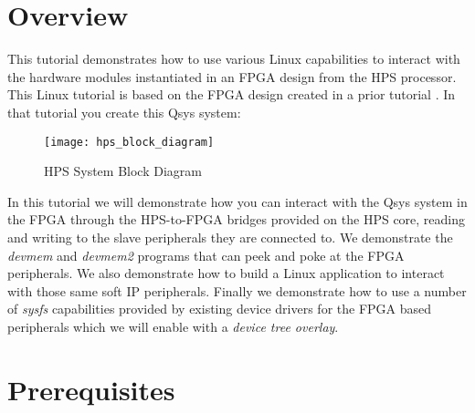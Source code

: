 \tableofcontents

\section*{Overview}

\begin{flushleft}
\noindent
This tutorial demonstrates how to use various Linux capabilities to interact with the hardware modules instantiated in an FPGA design from the HPS processor.  This Linux tutorial is based on the FPGA design created in a prior tutorial .  In that tutorial you create this Qsys system:

\begin{figure}[H]
\centering
\texttt{[image: hps\_block\_diagram]}
\caption{HPS System Block Diagram}
\label{fig:hps_block_diagram}
\end{figure}

In this tutorial we will demonstrate how you can interact with the Qsys system in the FPGA through the HPS-to-FPGA bridges provided on the HPS core, reading and writing to the slave peripherals they are connected to.  We demonstrate the \emph{devmem} and \emph{devmem2} programs that can peek and poke at the FPGA peripherals.  We also demonstrate how to build a Linux application to interact with those same soft IP peripherals.  Finally we demonstrate how to use a number of \emph{sysfs} capabilities provided by existing device drivers for the FPGA based peripherals which we will enable with a \emph{device tree overlay}.

\end{flushleft}

\section*{Prerequisites}

